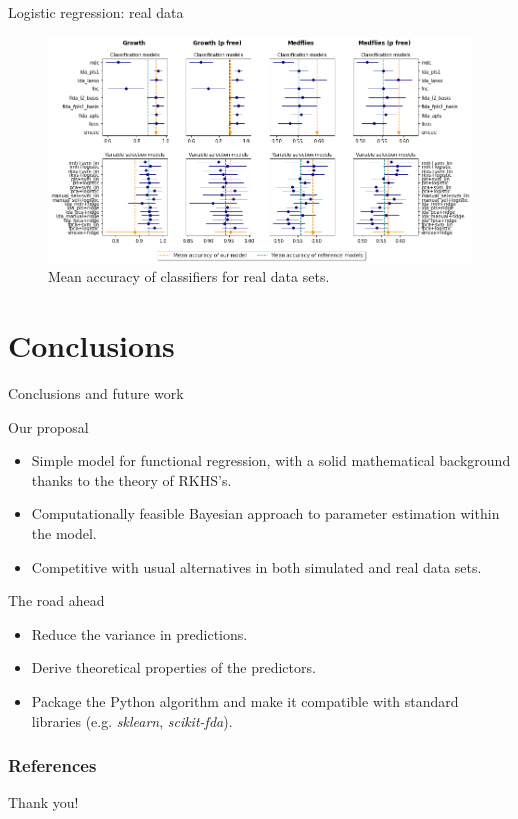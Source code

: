 \documentclass[10pt, english, professionalfonts]{beamer}
\begin{document}
\begin{frame}{Logistic regression: real data}
    \vspace{1em}
  \begin{figure}
    \includegraphics[width=\textwidth]{img/clf_emcee_real}
    \caption{Mean accuracy of classifiers for real data sets.}
  \end{figure}
\end{frame}


\section{Conclusions}

\begin{frame}{Conclusions and future work}

  \begin{alertblock}{Our proposal}
    \begin{itemize}
      \item Simple model for functional regression, with a solid mathematical background thanks to the theory of RKHS's.
      \item Computationally feasible Bayesian approach to parameter estimation within the model.
      \item Competitive with usual alternatives in both simulated and real data sets.
    \end{itemize}
  \end{alertblock}

  \begin{exampleblock}{The road ahead}
    \begin{itemize}
      \item Reduce the variance in predictions.
      \item Derive theoretical properties of the predictors.
      \item Package the Python algorithm and make it compatible with standard libraries (e.g. \textit{sklearn}, \textit{scikit-fda}).
    \end{itemize}
  \end{exampleblock}


\end{frame}

\begin{frame}[allowframebreaks]
    \frametitle{References}
    \nocite{*}
    \printbibliography[heading=none]
\end{frame}

\begin{frame}[standout]
  Thank you!
\end{frame}
\end{document}
